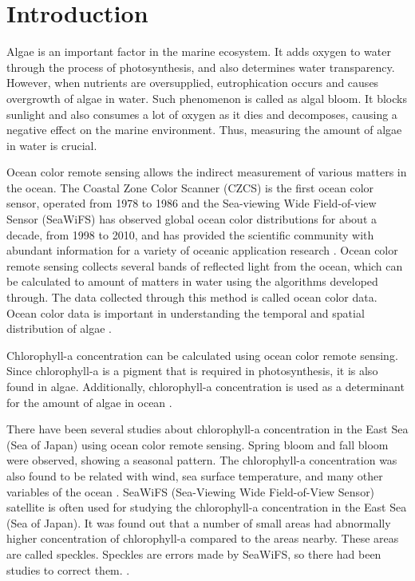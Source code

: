 \section{Introduction}

Algae is an important factor in the marine ecosystem. It adds oxygen to water through the process of photosynthesis, and also determines water transparency. However, when nutrients are oversupplied, eutrophication occurs and causes overgrowth of algae in water. Such phenomenon is called as algal bloom. It blocks sunlight and also consumes a lot of oxygen as it dies and decomposes, causing a negative effect on the marine environment. Thus, measuring the amount of algae in water is crucial.

Ocean color remote sensing allows the indirect measurement of various matters in the ocean. The Coastal Zone Color Scanner (CZCS) is the first ocean color sensor, operated from 1978 to 1986 and the Sea-viewing Wide Field-of-view Sensor (SeaWiFS) has observed global ocean color distributions for about a decade, from 1998 to 2010, and has provided the scientific community with abundant information for a variety of oceanic application research \cite{kyung2013characteristics, hooker1992An}. Ocean color remote sensing collects several bands of reflected light from the ocean, which can be calculated to amount of matters in water using the algorithms developed through. The data collected through this method is called ocean color data. Ocean color data is important in understanding the temporal and spatial distribution of algae \cite{kimhc2016surface}.

Chlorophyll-a concentration can be calculated using ocean color remote sensing. Since chlorophyll-a is a pigment that is required in photosynthesis, it is also found in algae. Additionally, chlorophyll-a concentration is used as a determinant for the amount of algae in ocean \cite{o2000ocean}. 

There have been several studies about chlorophyll-a concentration in the East Sea (Sea of Japan) using ocean color remote sensing. Spring bloom and fall bloom were observed, showing a seasonal pattern. The chlorophyll-a concentration was also found to be related with wind, sea surface temperature, and many other variables of the ocean \cite{yamada2004seasonal}. SeaWiFS (Sea-Viewing Wide Field-of-View Sensor) satellite is often used for studying the chlorophyll-a concentration in the East Sea (Sea of Japan). It was found out that a number of small areas had abnormally higher concentration of chlorophyll-a compared to the areas nearby. These areas are called speckles. Speckles are errors made by SeaWiFS, so there had been studies to correct them. \cite{chae2009characteristics}. 

